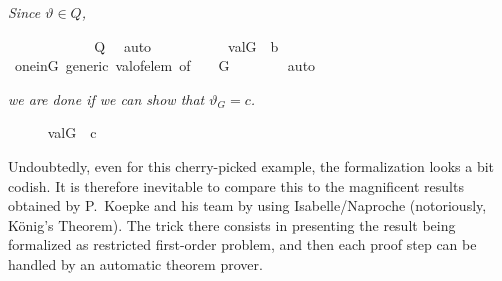 \textit{Since
  $\vartheta \in Q$,}
\begin{isabelle}
\ \ \ \ \isamarkupfalse%
\isanewline
\ \ \ \ \isamarkupfalse%
\ {\isachardoublequoteopen}{\isacharquery}{\kern0pt}{\isasymtheta}\ {\isasymin}\ {\isacharquery}{\kern0pt}Q{\isachardoublequoteclose}\ \isamarkupfalse%
\ auto\isanewline
\ \ \ \ \isamarkupfalse%
\isanewline
\ \ \ \ \isamarkupfalse%
\ {\isachardoublequoteopen}val{\isacharparenleft}{\kern0pt}G{\isacharcomma}{\kern0pt}{\isacharquery}{\kern0pt}{\isasymtheta}{\isacharparenright}{\kern0pt}\ {\isasymin}\ {\isacharquery}{\kern0pt}b{\isachardoublequoteclose}\isanewline
\ \ \ \ \ \ \isamarkupfalse%
\ one{\isacharunderscore}{\kern0pt}in{\isacharunderscore}{\kern0pt}G\ generic\ val{\isacharunderscore}{\kern0pt}of{\isacharunderscore}{\kern0pt}elem\ {\isacharbrackleft}{\kern0pt}of\ {\isacharquery}{\kern0pt}{\isasymtheta}\ {\isasymone}\ {\isacharquery}{\kern0pt}{\isasympi}\ G{\isacharbrackright}{\kern0pt}\isanewline
\ \ \ \ \ \ \isamarkupfalse%
\ auto
\end{isabelle}
\textit{we are done if we can show that
  $\vartheta_{G}=c$.}
\begin{isabelle}
\ \ \ \ \isamarkupfalse%
\ {\isachardoublequoteopen}val{\isacharparenleft}{\kern0pt}G{\isacharcomma}{\kern0pt}{\isacharquery}{\kern0pt}{\isasymtheta}{\isacharparenright}{\kern0pt}\ {\isacharequal}{\kern0pt}\ c{\isachardoublequoteclose}
\end{isabelle}

Undoubtedly, even for this cherry-picked example, the formalization
looks a bit codish. It is therefore inevitable to compare this to the
magnificent results obtained by P.~Koepke and his team by using
Isabelle/Naproche \cite{10.1007/978-3-030-81097-9_2} (notoriously,
König's Theorem). The trick there consists in presenting the result
being formalized as restricted first-order problem, and then each
proof step can be handled by an automatic theorem prover.

